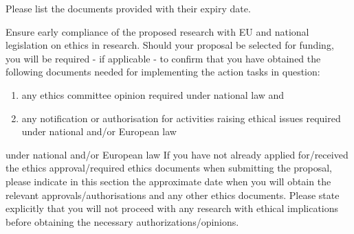 \medskip\noindent
Please list the documents provided with their expiry date.

\medskip\noindent
Ensure early compliance of the proposed research with EU and national legislation on
ethics in research. Should your proposal be selected for funding, you will be required - if
applicable - to confirm that you have obtained the following documents needed for
implementing the action tasks in question:

\begin{enumerate}[label=(\alph*)]
  \item any ethics committee opinion required under national law and
  \item any notification or authorisation for activities raising ethical issues required under national and/or European law
\end{enumerate}

\medskip\noindent
under national and/or European law
If you have not already applied for/received the ethics approval/required ethics
documents when submitting the proposal, please indicate in this section the approximate
date when you will obtain the relevant approvals/authorisations and any other ethics
documents. Please state explicitly that you will not proceed with any research with ethical
implications before obtaining the necessary authorizations/opinions.

\medskip\noindent
{}

